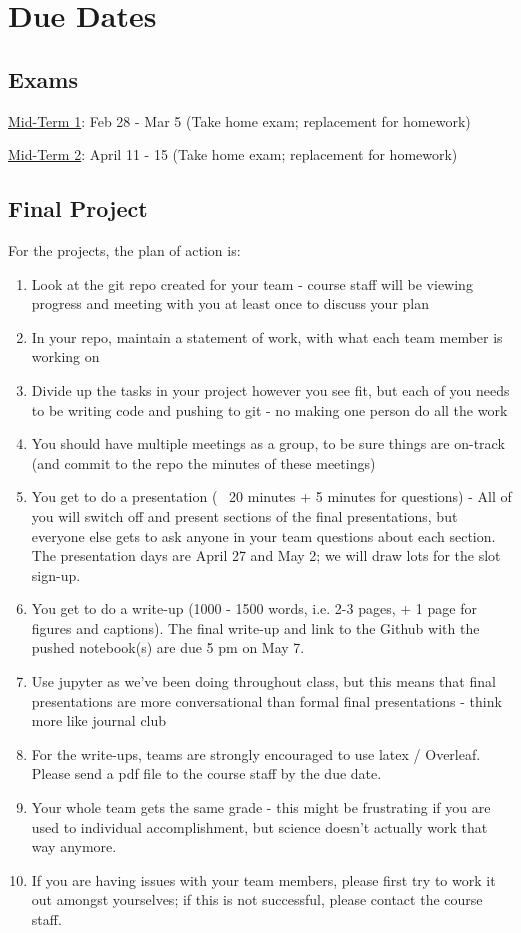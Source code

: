 \documentclass[12pt]{article}
\begin{document}
\section*{\centering Due Dates}
\subsection*{Exams}
\noindent \underline{Mid-Term 1}: Feb 28 - Mar 5 (Take home exam; replacement for homework)

\noindent \underline{Mid-Term 2}: April 11 - 15 (Take home exam; replacement for homework)


\subsection*{Final Project}
For the projects, the plan of action is:

\begin{enumerate}
\item Look at the git repo created for your team - course staff will be viewing progress and meeting with you at least once to discuss your plan
\item In your repo, maintain a statement of work, with what each team member is working on
\item Divide up the tasks in your project however you see fit, but each of you needs to be writing code and pushing to git - no making one person do all the work
\item You should have multiple meetings as a group, to be sure things are on-track (and commit to the repo the minutes of these meetings)
\item You get to do a presentation (~ 20 minutes + 5 minutes for questions) - All of you will switch off and present sections of the final presentations, but everyone else gets to ask anyone in your team questions about each section. The presentation days are April 27 and May 2; we will draw lots for the slot sign-up. 
\item You get to do a write-up (1000 - 1500 words, i.e. 2-3 pages, + 1 page for figures and captions). The final write-up and link to the Github with the pushed notebook(s) are due 5 pm on May 7.
\item Use jupyter as we've been doing throughout class, but this means that final presentations are more conversational than formal final presentations - think more like journal club
\item For the write-ups, teams are strongly encouraged to use latex / Overleaf. Please send a pdf file to the course staff by the due date.
\item Your whole team gets the same grade - this might be frustrating if you are used to individual accomplishment, but science doesn't actually work that way anymore. 
\item If you are having issues with your team members, please first try to work it out amongst yourselves; if this is not successful, please contact the course staff.
\end{enumerate}
    
\end{document}
